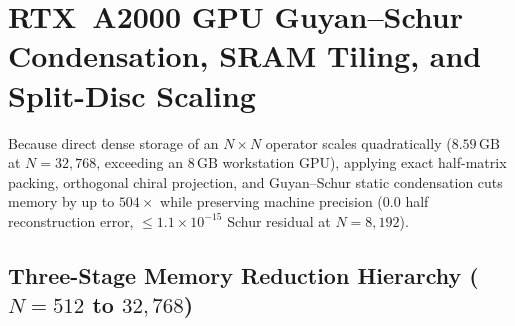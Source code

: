 \documentclass[10pt]{article}
\renewcommand{\_}{\OrigUnderscore\hspace{0pt}}
\numberwithin{equation}{section}
\begin{document}
\begin{table}[htbp]
\centering
\caption{Keystone Arch Stress-Stage Enclosures ($846.9\times$ UV Depletion) and Resolvent Hinge Continuity Scan}\label{tab:keystone-hinge}
\end{table}

\section{RTX~A2000 GPU Guyan--Schur Condensation, SRAM Tiling, and Split-Disc Scaling}\label{sec:gpu-schur-sram}

Because direct dense storage of an $N \times N$ operator scales quadratically ($8.59\,\mathrm{GB}$ at $N = 32{,}768$, exceeding an $8\,\mathrm{GB}$ workstation GPU), applying exact half-matrix packing, orthogonal chiral projection, and Guyan--Schur static condensation cuts memory by up to $504\times$ while preserving machine precision ($0.0$ half reconstruction error, $\le 1.1\times 10^{-15}$ Schur residual at $N = 8{,}192$).

\subsection{Three-Stage Memory Reduction Hierarchy ($N = 512$ to $32{,}768$)}\label{subsec:three-stage-vram}
\end{document}
